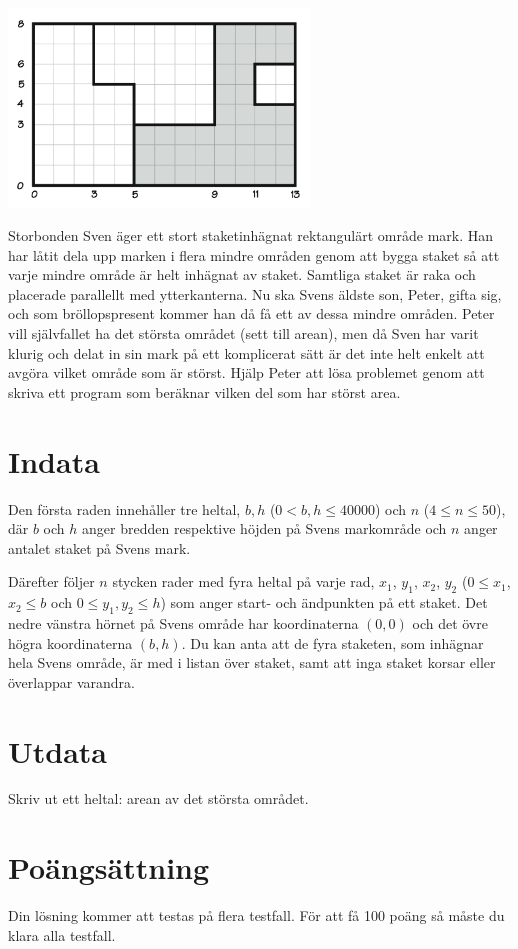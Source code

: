 

\begin{center}
\includegraphics[width=0.6\textwidth]{markant.png}
\end{center}

Storbonden Sven äger ett stort staketinhägnat rektangulärt område mark. Han har låtit dela upp marken i flera mindre områden genom att bygga staket så att varje mindre område är helt inhägnat av staket. Samtliga staket är raka och placerade parallellt med ytterkanterna. Nu ska Svens äldste son, Peter, gifta sig, och som bröllopspresent kommer han då få ett av dessa mindre områden. Peter vill självfallet ha det största området (sett till arean), men då Sven har varit klurig och delat in sin mark på ett komplicerat sätt är det inte helt enkelt att avgöra vilket område som är störst. Hjälp Peter att lösa problemet genom att skriva ett program som beräknar vilken del som har störst area.



\section*{Indata}
Den första raden innehåller tre heltal, $b, h$ ($0 < b, h \le 40000$) och $n$ ($4 \le n \le 50$),
där $b$ och $h$ anger bredden respektive höjden på Svens markområde och $n$ anger antalet staket på Svens mark.

Därefter följer $n$ stycken rader med fyra heltal på varje rad, $x_1$, $y_1$, $x_2$, $y_2$
($0 \le x_1$, $x_2 \le b$ och $0 \le y_1, y_2 \le h$) som anger start- och ändpunkten på ett staket.
Det nedre vänstra hörnet på Svens område har koordinaterna $(0, 0)$ och det övre högra koordinaterna $(b, h)$.
Du kan anta att de fyra staketen, som inhägnar hela Svens område, är med i listan över staket,
samt att inga staket korsar eller överlappar varandra.

\section*{Utdata}
Skriv ut ett heltal: arean av det största området.


\section*{Poängsättning}
Din lösning kommer att testas på flera testfall. För att få 100 poäng så måste du klara alla testfall.



